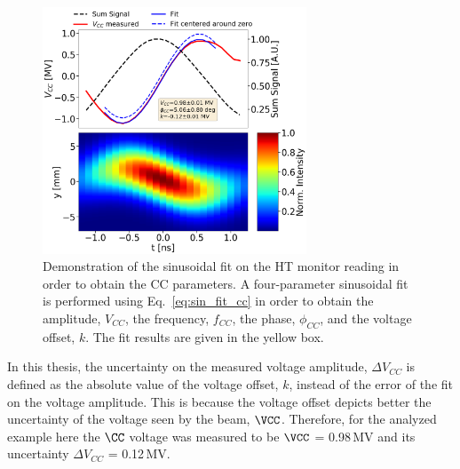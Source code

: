 \begin{figure}[!h]
   \centering         
   \includegraphics[width=0.7\textwidth]{images/Ch4/HT_VCC_callibration_20180530_135105_sin_fit_fixed_freq_CC_post_processing.png}
       \caption{Demonstration of the sinusoidal fit on the HT monitor reading in order to obtain the CC parameters. A four-parameter sinusoidal fit is performed using Eq.~\eqref{eq:sin_fit_cc} in order to obtain the amplitude, $V_{CC}$, the frequency, $f_{CC}$, the phase, $\phi_{CC}$, and the voltage offset, $k$. The fit results are given in the yellow box.}
       \label{fig:crabbing_sin_fit_MD2}
\end{figure}

In this thesis, the uncertainty on the measured voltage amplitude, $\Delta V_{CC}$ is defined as the absolute value of the voltage offset, $k$, instead of the error of the fit on the voltage amplitude. This is because the voltage offset depicts better the uncertainty of the voltage seen by the beam, $\VCC$. Therefore, for the analyzed example here the $\CC$ voltage was measured to be $\VCC$ = 0.98\,MV and its uncertainty $\Delta V_{CC}$ = 0.12\,MV. 




